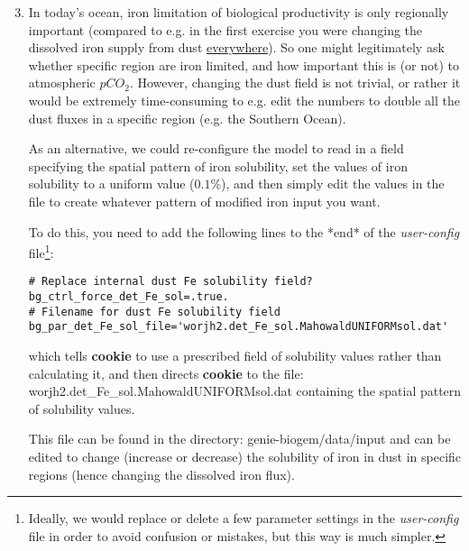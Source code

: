 \begin{enumerate}[noitemsep]
\setcounter{enumi}{2}

\vspace{1mm}
\item In today's ocean, iron limitation of biological productivity is only regionally important (compared to e.g. in the first exercise you were changing the dissolved iron supply from dust \uline{everywhere}). So one might legitimately ask whether specific region are iron limited, and how important this is (or not) to atmospheric \(pCO_{2}\). However, changing the dust field is not trivial, or rather it would be extremely time-consuming to e.g. edit the numbers to double all the dust fluxes in a specific region (e.g. the Southern Ocean).

\vspace{1mm}
As an alternative, we could re-configure the model to read in a field specifying the spatial pattern of iron solubility, set the values of iron solubility to a uniform value (\(0.1\%\)), and then simply edit the values in the file to create whatever pattern of modified iron input you want.

\newpage
%
To do this, you need to add the following lines to the *end* of the \textit{user-config} file\footnote{Ideally, we would replace or delete a few parameter settings in the \textit{user-config} file in order to avoid confusion or mistakes, but this way is much simpler.}:

\vspace{-1mm}\small\begin{verbatim}
# Replace internal dust Fe solubility field?
bg_ctrl_force_det_Fe_sol=.true.
# Filename for dust Fe solubility field
bg_par_det_Fe_sol_file='worjh2.det_Fe_sol.MahowaldUNIFORMsol.dat'
\end{verbatim}\normalsize\vspace{-1mm}
which tells \textbf{cookie} to use a prescribed field of solubility values rather than calculating it, and then directs \textbf{cookie} to the file: \textsf{\footnotesize worjh2.det\_Fe\_sol.MahowaldUNIFORMsol.dat} containing the spatial pattern of solubility values.

\vspace{1mm}
This file can be found in the directory: \textsf{\footnotesize genie-biogem/data/input} and can be edited to change (increase or decrease) the solubility of iron in dust in specific regions (hence changing the dissolved iron flux). 


\end{enumerate}
